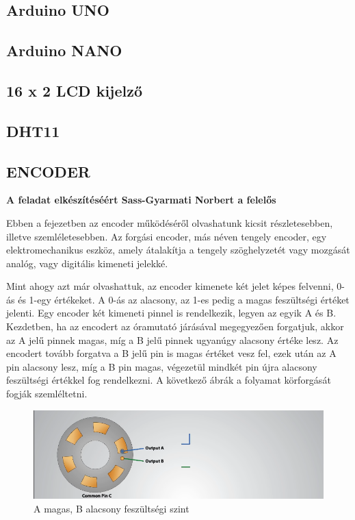 \documentclass[
]{thesis-ekf}
\theoremstyle{definition}
\theoremstyle{remark}
\begin{document}
		\subsection{Arduino UNO}
		\subsection{Arduino NANO}
		\subsection{16 x 2 LCD kijelző}
		\subsection{DHT11}		
		\subsection{ENCODER} \label{encoder}
			\par \textbf{A feladat elkészítéséért Sass-Gyarmati Norbert a felelős}
			\par Ebben a fejezetben az encoder működéséről olvashatunk kicsit részletesebben, illetve szemléletesebben. Az forgási encoder, más néven tengely encoder, egy elektromechanikus eszköz, amely átalakítja a tengely  szöghelyzetét vagy mozgását analóg, vagy digitális kimeneti jelekké.\cite{encoderwiki}
			\par Mint ahogy azt már olvashattuk, az encoder kimenete két jelet képes felvenni, 0-ás és 1-egy értékeket.  A 0-ás az alacsony, az 1-es pedig a magas feszültségi értéket jelenti. Egy encoder két kimeneti pinnel is rendelkezik, legyen az egyik A és B. Kezdetben, ha az encodert az óramutató járásával megegyezően forgatjuk, akkor az A jelű pinnek magas, míg a B jelű pinnek ugyanúgy alacsony értéke lesz. Az encodert tovább forgatva a B jelű pin is magas értéket vesz fel, ezek után az A pin alacsony lesz, míg a B pin magas, végezetül mindkét pin újra alacsony feszültségi értékkel fog rendelkezni. A következő ábrák a folyamat körforgását fogják szemléltetni.
			\begin{figure}[h]
				\centering
				\includegraphics[scale=0.50]{./images/firstenc}
				\caption{A magas, B alacsony feszültségi szint}
				\label{fig:first}
			\end{figure}
\end{document}
